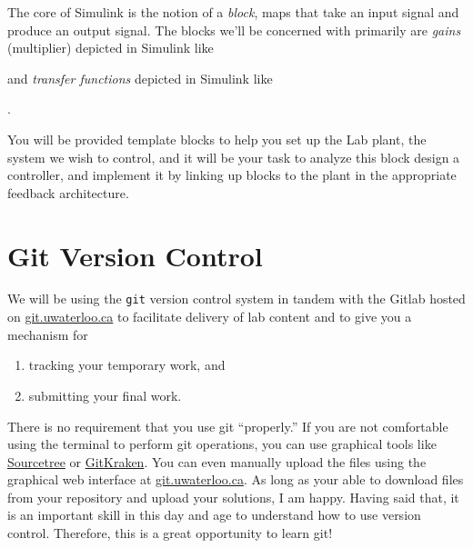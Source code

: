 The core of Simulink is the notion of a \emph{block}, maps that take an input
signal and produce an output signal.
The blocks we'll be concerned with primarily are \emph{gains}
(multiplier) depicted in Simulink like
\begin{center}
\end{center}
and \emph{transfer functions} depicted in Simulink like
\begin{center}
  .
\end{center}
You will be provided template blocks to help you set up the Lab plant, the
system we wish to control, and it will be your task to analyze this block
design a controller, and implement it by linking up blocks to the plant
in the appropriate feedback architecture.

\section{Git Version Control}
We will be using the \texttt{git} version control system in tandem with
the Gitlab hosted on \url{git.uwaterloo.ca} to facilitate delivery of lab
content and to give you a mechanism for
\begin{enumerate}[label=(\arabic*)]
  \item{tracking your temporary work, and}
  \item{submitting your final work.}
\end{enumerate}
There is no requirement that you use git ``properly.'' If you are not
comfortable using the terminal to perform git operations, you can use graphical
tools like \href{https://www.sourcetreeapp.com/}{Sourcetree} or
\href{https://www.gitkraken.com/git-client}{GitKraken}. You can even manually
upload the files using the graphical web interface at \url{git.uwaterloo.ca}.
As long as your able to download files from your repository and upload your
solutions, I am happy. Having said that, it is an important skill in this
day and age to understand how to use version control. Therefore, this is a
great opportunity to learn git!
